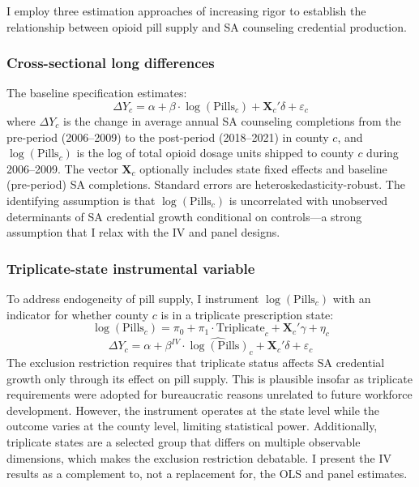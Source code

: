 \documentclass[12pt]{article}
\begin{document}
I employ three estimation approaches of increasing rigor to establish the relationship between opioid pill supply and SA counseling credential production.

\subsubsection*{Cross-sectional long differences} The baseline specification estimates:
\begin{equation}
\Delta Y_c = \alpha + \beta \cdot \log(\text{Pills}_c) + \mathbf{X}_c'\delta + \varepsilon_c
\label{eq:ols}
\end{equation}
where $\Delta Y_c$ is the change in average annual SA counseling completions from the pre-period (2006--2009) to the post-period (2018--2021) in county $c$, and $\log(\text{Pills}_c)$ is the log of total opioid dosage units shipped to county $c$ during 2006--2009. The vector $\mathbf{X}_c$ optionally includes state fixed effects and baseline (pre-period) SA completions. Standard errors are heteroskedasticity-robust. The identifying assumption is that $\log(\text{Pills}_c)$ is uncorrelated with unobserved determinants of SA credential growth conditional on controls---a strong assumption that I relax with the IV and panel designs.

\subsubsection*{Triplicate-state instrumental variable} To address endogeneity of pill supply, I instrument $\log(\text{Pills}_c)$ with an indicator for whether county $c$ is in a triplicate prescription state:
\begin{equation}
\log(\text{Pills}_c) = \pi_0 + \pi_1 \cdot \text{Triplicate}_c + \mathbf{X}_c'\gamma + \eta_c
\label{eq:first_stage}
\end{equation}
\begin{equation}
\Delta Y_c = \alpha + \beta^{IV} \cdot \widehat{\log(\text{Pills})}_c + \mathbf{X}_c'\delta + \varepsilon_c
\label{eq:iv}
\end{equation}
The exclusion restriction requires that triplicate status affects SA credential growth only through its effect on pill supply. This is plausible insofar as triplicate requirements were adopted for bureaucratic reasons unrelated to future workforce development. However, the instrument operates at the state level while the outcome varies at the county level, limiting statistical power. Additionally, triplicate states are a selected group that differs on multiple observable dimensions, which makes the exclusion restriction debatable. I present the IV results as a complement to, not a replacement for, the OLS and panel estimates.
\end{document}
